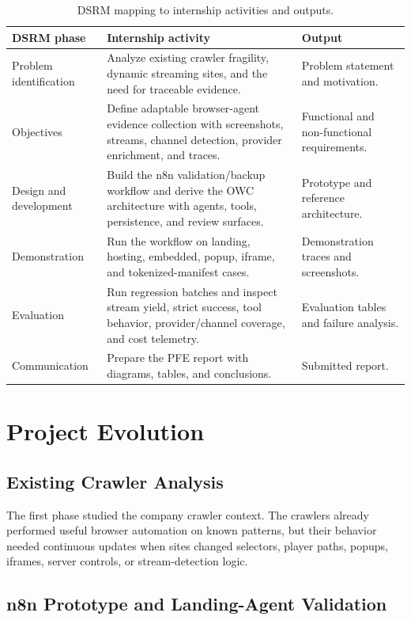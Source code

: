 \begin{table}[!htbp]
\centering
\begin{tabularx}{\textwidth}{Q{3.1cm} Y Y}
\toprule
{}
DSRM phase & Internship activity & Output \\
\midrule
Problem identification & Analyze existing crawler fragility, dynamic streaming
sites, and the need for traceable evidence. & Problem statement and motivation. \\
Objectives & Define adaptable browser-agent evidence collection with
screenshots, streams, channel detection, provider enrichment, and traces. &
Functional and non-functional requirements. \\
Design and development & Build the n8n validation/backup workflow and derive
the OWC architecture with agents, tools, persistence, and review surfaces. &
Prototype and reference architecture. \\
Demonstration & Run the workflow on landing, hosting, embedded, popup, iframe,
and tokenized-manifest cases. & Demonstration traces and screenshots. \\
Evaluation & Run regression batches and inspect stream yield, strict success,
tool behavior, provider/channel coverage, and cost telemetry. & Evaluation
tables and failure analysis. \\
Communication & Prepare the PFE report with diagrams, tables, and conclusions.
& Submitted report. \\
\bottomrule
\end{tabularx}
\caption{DSRM mapping to internship activities and outputs.}
\label{tab:dsrm-application}
\end{table}

\section{Project Evolution}

\subsection{Existing Crawler Analysis}

The first phase studied the company crawler context. The crawlers already
performed useful browser automation on known patterns, but their behavior
needed continuous updates when sites changed selectors, player paths, popups,
iframes, server controls, or stream-detection logic.

\subsection{n8n Prototype and Landing-Agent Validation}

